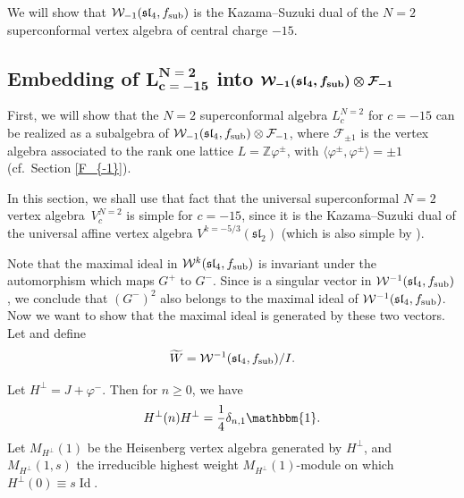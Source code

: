 \documentclass[11pt]{article}
\numberwithin{equation}{section}
\newcommand{\F}{\mathcal F}
\begin{document}
 We will show that $\mathcal{W}_{-1}(\mathfrak{sl}_4, f_{\rm sub})$ is the Kazama--Suzuki dual of the $N=2$ superconformal vertex algebra of central charge $-15$.



\subsection[Embedding of L\^{}N=2\_c=-15 into W\_-1(sl\_4, f\_ ub)]{Embedding of $\boldsymbol{ L^{N=2}_{c=-15}}$ into $\boldsymbol{\mathcal{W}_{-1}(\mathfrak{sl}_4, f_{\rm sub}) \otimes \F_{-1}}$}

First, we will show that the $N=2$ superconformal algebra $L^{N=2}_{c}$ for $c=-15$ can be realized as a subalgebra of $\mathcal{W}_{-1}(\mathfrak{sl}_4, f_{\rm sub}) \otimes \F_{-1}$, where $\F_{\pm 1}$ is the vertex algebra associated to the rank one lattice $L= {\mathbb{Z}}\varphi^{\pm}$, with $\big\langle \varphi^{\pm}, \varphi^{\pm} \big\rangle = \pm 1$ (cf.\ Section \ref{F_{-1}}).

 In this section, we shall use that fact that the universal superconformal $N=2$ vertex algebra~$V^{N=2}_{c}$ is simple for $c=-15$, since it is the Kazama--Suzuki dual of the universal affine vertex algebra $V^{k=-5/3}(\mathfrak{sl}_2)$ (which is also simple by \cite{GK}).

 Note that the maximal ideal in $\mathcal W^k(\mathfrak{sl}_4, f_{\rm sub})$ is invariant under the automorphism which maps $G^+$ to $G^-$. Since  is a singular vector in $\mathcal{W}^{-1}(\mathfrak{sl}_4, f_{\rm sub}) $, we conclude that $(G^-)^2$ also belongs to the maximal ideal of $\mathcal{W}^{-1}(\mathfrak{sl}_4, f_{\rm sub}) $. Now we want to show that the maximal ideal is generated by these two vectors.
Let  and define
\[
 \widetilde W = \mathcal{W}^{-1}(\mathfrak{sl}_4, f_{\rm sub})/I.
 \]

Let $H^{\perp} = J + \varphi^-$. Then for $n \ge 0$, we have
\[
H^{\perp}(n) H^{\perp} = \frac{1}{4} \delta_{n,1}\mathbbm{1}.
\]
Let $M_{H^{\perp}} (1)$ be the Heisenberg vertex algebra generated by $H^{\perp}$, and $M_{H^{\perp}} (1, s)$ the irreducible highest weight $M_{H^{\perp}} (1)$-module on which
$H^{\perp}(0) \equiv s \operatorname{Id}$.
\end{document}

